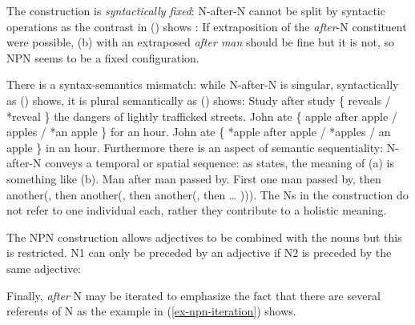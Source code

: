 \documentclass[output=paper]{langsci/langscibook}
\begin{document}
\eal
\settowidth{}
\zl

The construction is \emph{syntactically fixed}: N-after-N cannot be split by syntactic operations as the
contrast in () shows \citep{Matsuyama2004a}:
\eal
{}
\zl
If extraposition of the \emph{after}-N constituent were possible, (b) with an extraposed
\emph{after man} should be fine but it is not, so NPN seems to be a fixed configuration.

There is a syntax-semantics mismatch:
while N-after-N is singular, syntactically as () shows, it is plural semantically as
() shows:
\ea
Study after study \{ reveals / *reveal \} the dangers of lightly trafficked streets.
\z
\eal
\ex John ate \{ apple after apple / apples / *an apple \} for an hour. 
\ex John ate \{ *apple after apple / *apples / an apple \} in an hour.
\zl
Furthermore there is an aspect of semantic sequentiality: N-after-N conveys a temporal or spatial
sequence: as \citet{Bargmann2015a} states, the meaning of (a) is something like (b).
\eal
\ex Man after man passed by. 
\ex First one man passed by, then another(, then another(, then another(, then  \ldots{} ))). 
\zl
The Ns in the construction do not refer to one individual each, rather they contribute to a holistic meaning.

The NPN construction allows adjectives to be combined with the nouns but this is restricted.
N1 can only be preceded by an adjective if N2 is preceded by the same adjective: 
\eal
{}
\zl

Finally, \emph{after} N may be iterated to emphasize the fact that there are several referents of N as the example in (\ref{ex-npn-iteration}) shows. 
\end{document}
